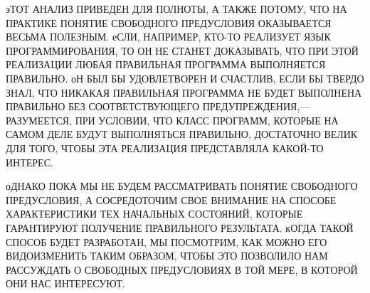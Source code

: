 эТОТ АНАЛИЗ ПРИВЕДЕН ДЛЯ ПОЛНОТЫ, А ТАКЖЕ ПОТОМУ, ЧТО НА ПРАКТИКЕ 
ПОНЯТИЕ СВОБОДНОГО ПРЕДУСЛОВИЯ ОКАЗЫВАЕТСЯ ВЕСЬМА ПОЛЕЗНЫМ. еСЛИ, 
НАПРИМЕР, КТО-ТО РЕАЛИЗУЕТ ЯЗЫК ПРОГРАММИРОВАНИЯ, ТО ОН НЕ СТАНЕТ 
ДОКАЗЫВАТЬ, ЧТО ПРИ ЭТОЙ РЕАЛИЗАЦИИ ЛЮБАЯ ПРАВИЛЬНАЯ ПРОГРАММА 
ВЫПОЛНЯЕТСЯ ПРАВИЛЬНО. оН БЫЛ БЫ УДОВЛЕТВОРЕН И СЧАСТЛИВ, ЕСЛИ БЫ ТВЕРДО 
ЗНАЛ, ЧТО НИКАКАЯ ПРАВИЛЬНАЯ ПРОГРАММА НЕ БУДЕТ ВЫПОЛНЕНА ПРАВИЛЬНО БЕЗ 
СООТВЕТСТВУЮЩЕГО ПРЕДУПРЕЖДЕНИЯ,--- РАЗУМЕЕТСЯ, ПРИ УСЛОВИИ, ЧТО КЛАСС 
ПРОГРАММ, КОТОРЫЕ НА САМОМ ДЕЛЕ БУДУТ ВЫПОЛНЯТЬСЯ ПРАВИЛЬНО, ДОСТАТОЧНО 
ВЕЛИК ДЛЯ ТОГО, ЧТОБЫ ЭТА РЕАЛИЗАЦИЯ ПРЕДСТАВЛЯЛА КАКОЙ-ТО ИНТЕРЕС.

оДНАКО ПОКА МЫ НЕ БУДЕМ РАССМАТРИВАТЬ ПОНЯТИЕ СВОБОДНОГО ПРЕДУСЛОВИЯ, А 
СОСРЕДОТОЧИМ СВОЕ ВНИМАНИЕ НА СПОСОБЕ ХАРАКТЕРИСТИКИ ТЕХ НАЧАЛЬНЫХ 
СОСТОЯНИЙ, КОТОРЫЕ ГАРАНТИРУЮТ ПОЛУЧЕНИЕ ПРАВИЛЬНОГО РЕЗУЛЬТАТА. кОГДА 
ТАКОЙ СПОСОБ БУДЕТ РАЗРАБОТАН, МЫ ПОСМОТРИМ, КАК МОЖНО ЕГО ВИДОИЗМЕНИТЬ 
ТАКИМ ОБРАЗОМ, ЧТОБЫ ЭТО ПОЗВОЛИЛО НАМ РАССУЖДАТЬ О СВОБОДНЫХ 
ПРЕДУСЛОВИЯХ В ТОЙ МЕРЕ, В КОТОРОЙ ОНИ НАС ИНТЕРЕСУЮТ.

\bye
